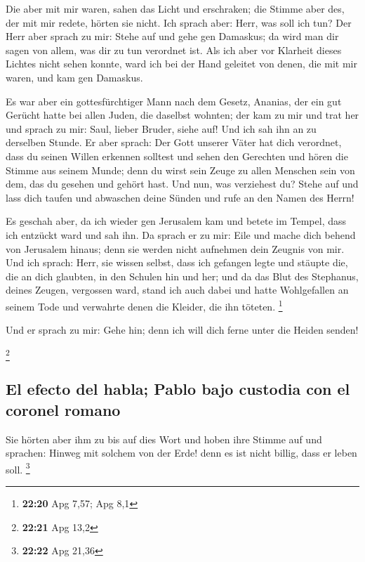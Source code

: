  Die aber mit mir waren, sahen das Licht und erschraken;
die Stimme aber des, der mit mir redete, hörten sie nicht.
 Ich sprach aber: Herr, was soll ich tun? Der Herr aber
sprach zu mir: Stehe auf und gehe gen Damaskus; da wird man dir sagen
von allem, was dir zu tun verordnet ist.  Als ich aber
vor Klarheit dieses Lichtes nicht sehen konnte, ward ich bei der Hand
geleitet von denen, die mit mir waren, und kam gen Damaskus.

 Es war aber ein gottesfürchtiger Mann nach dem Gesetz,
Ananias, der ein gut Gerücht hatte bei allen Juden, die daselbst
wohnten;  der kam zu mir und trat her und sprach zu mir:
Saul, lieber Bruder, siehe auf! Und ich sah ihn an zu derselben Stunde.
 Er aber sprach: Der Gott unserer Väter hat dich
verordnet, dass du seinen Willen erkennen solltest und sehen den
Gerechten und hören die Stimme aus seinem Munde;  denn du
wirst sein Zeuge zu allen Menschen sein von dem, das du gesehen und
gehört hast.  Und nun, was verziehest du? Stehe auf und
lass dich taufen und abwaschen deine Sünden und rufe an den Namen des
Herrn!

 Es geschah aber, da ich wieder gen Jerusalem kam und
betete im Tempel, dass ich entzückt ward und sah ihn.  Da
sprach er zu mir: Eile und mache dich behend von Jerusalem hinaus; denn
sie werden nicht aufnehmen dein Zeugnis von mir.  Und ich
sprach: Herr, sie wissen selbst, dass ich gefangen legte und stäupte
die, die an dich glaubten, in den Schulen hin und her; 
und da das Blut des Stephanus, deines Zeugen, vergossen ward, stand ich
auch dabei und hatte Wohlgefallen an seinem Tode und verwahrte denen die
Kleider, die ihn töteten. \footnote{\textbf{22:20} Apg 7,57; Apg 8,1}

 Und er sprach zu mir: Gehe hin; denn ich will dich ferne
unter die Heiden senden!

\footnote{\textbf{22:21} Apg 13,2}

\hypertarget{el-efecto-del-habla-pablo-bajo-custodia-con-el-coronel-romano}{%
\subsection{El efecto del habla; Pablo bajo custodia con el coronel
romano}\label{el-efecto-del-habla-pablo-bajo-custodia-con-el-coronel-romano}}

 Sie hörten aber ihm zu bis auf dies Wort und hoben ihre
Stimme auf und sprachen: Hinweg mit solchem von der Erde! denn es ist
nicht billig, dass er leben soll. \footnote{\textbf{22:22} Apg 21,36}

